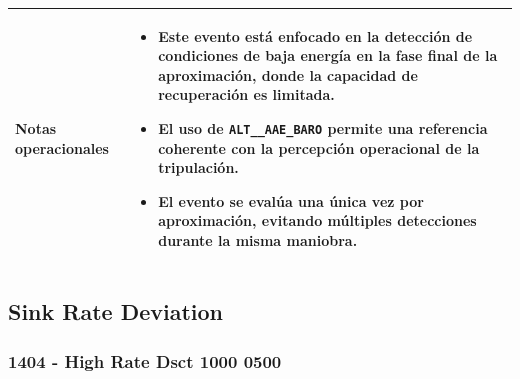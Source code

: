 \documentclass[11pt,a4paper]{article}
\begin{document}
\begin{longtable}{p{5cm} p{9.5cm}}
		\textbf{Notas operacionales} &
		\begin{itemize}
			\item Este evento está enfocado en la detección de condiciones de baja energía en la fase final de la aproximación, donde la capacidad de recuperación es limitada.
			\item El uso de \texttt{ALT\_\_AAE\_BARO} permite una referencia coherente con la percepción operacional de la tripulación.
			\item El evento se evalúa una única vez por aproximación, evitando múltiples detecciones durante la misma maniobra.
		\end{itemize} \\
		\hline
		
	\end{longtable} \newpage
	
	\subsection{Sink Rate Deviation}
	
	\subsubsection{1404 - High Rate Dsct 1000 0500}
	
\end{document}
